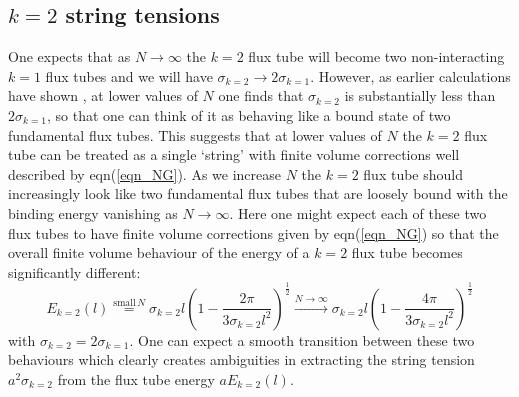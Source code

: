 \documentclass[12pt]{article}
\begin{document}
%
%
\subsection{$k=2$ string tensions}
\label{subsection_k2strings}

One expects that as $N\to\infty$ the $k=2$ flux tube will become two non-interacting $k=1$
flux tubes and we will have $\sigma_{k=2}\to 2\sigma_{k=1}$. However, as
earlier calculations have shown
%
\cite{BLMT_K2,AABBMT_K,LDD_K2},
%
at lower values of $N$ one finds that $\sigma_{k=2}$ is substantially less than $2\sigma_{k=1}$,
so that one can think of it as behaving like a bound state of two fundamental flux tubes.
This suggests that at lower values of $N$ the $k=2$ flux tube can be treated as a single
`string' with finite volume corrections well described by eqn(\ref{eqn_NG}). As we increase
$N$ the $k=2$ flux tube should increasingly look like two fundamental flux tubes that
are loosely bound with the binding energy vanishing as $N\to\infty$. Here one might
expect each of these two flux tubes to have finite volume corrections given by
eqn(\ref{eqn_NG}) so that the overall finite volume behaviour of the energy of a
$k=2$ flux tube becomes significantly different:
%
\begin{equation}
  E_{k=2}(l) \stackrel{\mathrm{small}\, N}{=}
  \sigma_{k=2} l\left( 1 - \frac{2\pi}{3\sigma_{k=2} l^2}\right)^{\frac{1}{2}}
  \stackrel{N\to\infty}{\longrightarrow}
  \sigma_{k=2} l\left( 1 - \frac{4\pi}{3\sigma_{k=2} l^2}\right)^{\frac{1}{2}}
  \label{eqn_NGk2}
\end{equation}
%
with $\sigma_{k=2}=2\sigma_{k=1}$. One can expect a smooth transition between these
two behaviours which clearly creates ambiguities in extracting the string tension
$a^2\sigma_{k=2}$ from the flux tube energy $aE_{k=2}(l)$.

\end{document}
